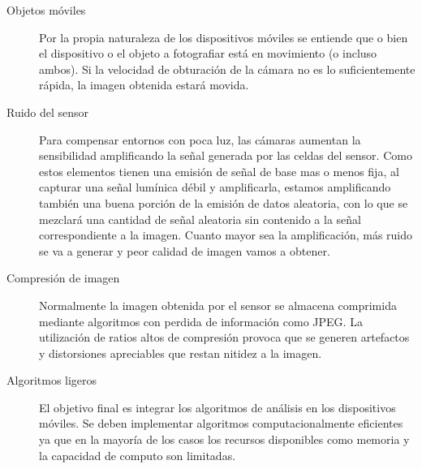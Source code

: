 \begin{description}
\item[Objetos móviles] Por la propia naturaleza de los dispositivos móviles se entiende que o bien el dispositivo o el objeto a fotografiar está en movimiento (o incluso ambos). Si la velocidad de obturación de la cámara no es lo suficientemente rápida, la imagen obtenida estará movida.
\item[Ruido del sensor] Para compensar entornos con poca luz, las cámaras aumentan la sensibilidad amplificando la señal generada por las celdas del sensor. Como estos elementos tienen una emisión de señal de base mas o menos fija, al capturar una señal lumínica débil y amplificarla, estamos amplificando también una buena porción de la emisión de datos aleatoria, con lo que se mezclará una cantidad de señal aleatoria sin contenido a la señal correspondiente a la imagen. Cuanto mayor sea la amplificación, más ruido se va a generar y peor calidad de imagen vamos a obtener. 
\item[Compresión de imagen] Normalmente la imagen obtenida por el sensor se almacena comprimida mediante algoritmos con perdida de información como JPEG. La utilización de ratios altos de compresión provoca que se generen artefactos y distorsiones apreciables que restan nitidez a la imagen.
\item[Algoritmos ligeros] El objetivo final es integrar los algoritmos de análisis en los dispositivos móviles. Se deben implementar algoritmos computacionalmente eficientes ya que en la mayoría de los casos los recursos disponibles como memoria  y la capacidad de computo son limitadas.
\end{description}



